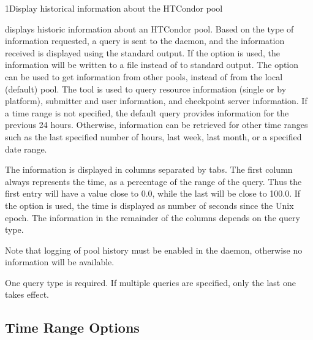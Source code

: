 \begin{ManPage}{}{1}{Display historical information about the HTCondor pool}
\label{man-condor-stats}

\Synopsis {}

\Description
{} displays historic information about an HTCondor pool.
Based on the type of information requested,
a query is sent to the  daemon,
and the information received is displayed using the standard output.
If the  option is used,
the information will be written to a file instead of
to standard output.
The  option can be used to get information from 
other pools, instead of from the local (default) pool.
The  tool is used to query resource 
information (single or by platform),
submitter and user information,
and checkpoint server information.
If a time range is not specified,
the default query provides information for the previous 24 hours.
Otherwise, information can be retrieved for other time ranges such as the last
specified number of hours, last week, last month, or a specified date range.

The information is displayed in columns separated by tabs.
The first column always represents the time,
as a percentage of the range of the query.
Thus the first entry will have a value close to 0.0,
while the last will be close to 100.0.
If the  option is used,
the time is displayed as number of seconds
since the Unix epoch.
The information in the remainder of the columns depends on the query type.

Note that logging of pool history must be enabled in the 
daemon, otherwise
no information will be available.

One query type is required.
If multiple queries are specified, only the last one takes effect.

\subsection*{Time Range Options}
\par
\begin{description}
\end{description}
\par


\end{ManPage}
